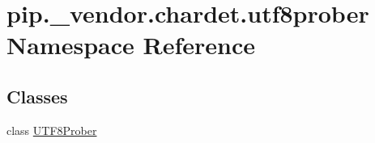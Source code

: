 \hypertarget{namespacepip_1_1__vendor_1_1chardet_1_1utf8prober}{}\section{pip.\+\_\+vendor.\+chardet.\+utf8prober Namespace Reference}
\label{namespacepip_1_1__vendor_1_1chardet_1_1utf8prober}
\subsection*{Classes}
\begin{DoxyCompactItemize}
\item 
class \hyperlink{classpip_1_1__vendor_1_1chardet_1_1utf8prober_1_1UTF8Prober}{U\+T\+F8\+Prober}
\end{DoxyCompactItemize}
